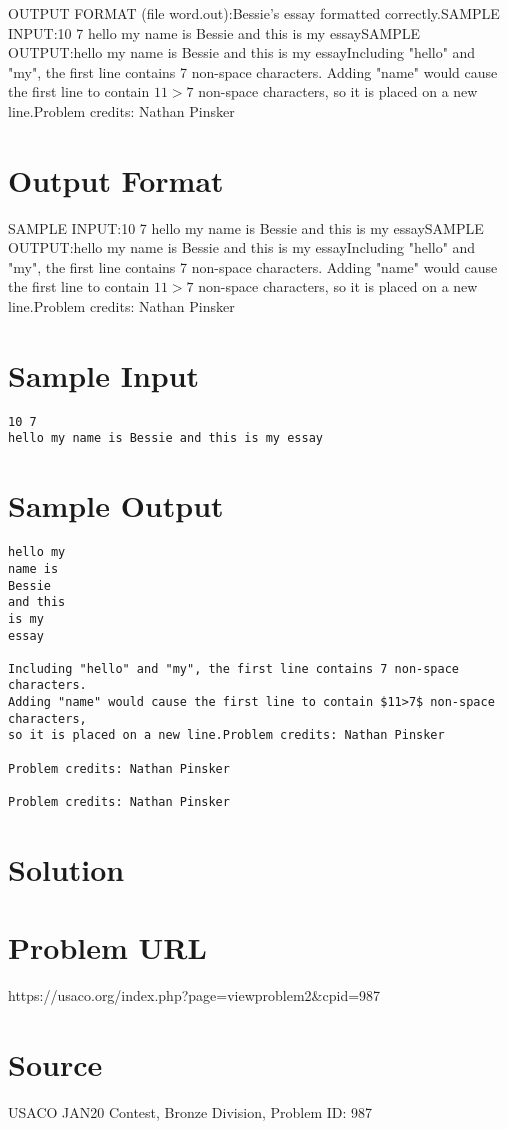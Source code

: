 \documentclass[12pt]{article}
\begin{document}
OUTPUT FORMAT (file word.out):Bessie's essay formatted correctly.SAMPLE INPUT:10 7
hello my name is Bessie and this is my essaySAMPLE OUTPUT:hello my
name is
Bessie
and this
is my
essayIncluding "hello" and "my", the first line contains 7 non-space characters.
Adding "name" would cause the first line to contain $11>7$ non-space characters,
so it is placed on a new line.Problem credits: Nathan Pinsker

\section*{Output Format}
SAMPLE INPUT:10 7
hello my name is Bessie and this is my essaySAMPLE OUTPUT:hello my
name is
Bessie
and this
is my
essayIncluding "hello" and "my", the first line contains 7 non-space characters.
Adding "name" would cause the first line to contain $11>7$ non-space characters,
so it is placed on a new line.Problem credits: Nathan Pinsker

\section*{Sample Input}
\begin{verbatim}
10 7
hello my name is Bessie and this is my essay
\end{verbatim}

\section*{Sample Output}
\begin{verbatim}
hello my
name is
Bessie
and this
is my
essay

Including "hello" and "my", the first line contains 7 non-space characters.
Adding "name" would cause the first line to contain $11>7$ non-space characters,
so it is placed on a new line.Problem credits: Nathan Pinsker

Problem credits: Nathan Pinsker

Problem credits: Nathan Pinsker
\end{verbatim}

\section*{Solution}


\section*{Problem URL}
https://usaco.org/index.php?page=viewproblem2&cpid=987

\section*{Source}
USACO JAN20 Contest, Bronze Division, Problem ID: 987
\end{document}
